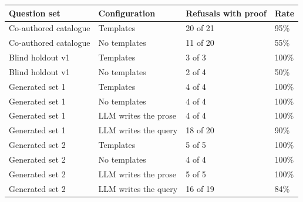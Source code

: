 \begin{tabular}{@{}L{0.28\textwidth}L{0.26\textwidth}R{0.16\textwidth}R{0.10\textwidth}@{}}
\toprule
Question set & Configuration & Refusals with proof & Rate \\
\midrule
Co-authored catalogue & Templates & 20 of 21 & 95\% \\
Co-authored catalogue & No templates & 11 of 20 & 55\% \\
Blind holdout v1 & Templates & 3 of 3 & 100\% \\
Blind holdout v1 & No templates & 2 of 4 & 50\% \\
Generated set 1 & Templates & 4 of 4 & 100\% \\
Generated set 1 & No templates & 4 of 4 & 100\% \\
Generated set 1 & LLM writes the prose & 4 of 4 & 100\% \\
Generated set 1 & LLM writes the query & 18 of 20 & 90\% \\
Generated set 2 & Templates & 5 of 5 & 100\% \\
Generated set 2 & No templates & 4 of 4 & 100\% \\
Generated set 2 & LLM writes the prose & 5 of 5 & 100\% \\
Generated set 2 & LLM writes the query & 16 of 19 & 84\% \\
\bottomrule
\end{tabular}
